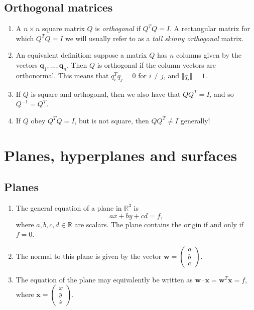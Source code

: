 \documentclass[11pt]{article}
\renewcommand*{\vec}[1]{\mathbf{#1}}
\begin{document}
\subsection{Orthogonal matrices}
\begin{enumerate}
\item A $n\times n$ square matrix $Q$ is \emph{orthogonal} if $\boxed{Q^TQ=I}$. A rectangular matrix for which $Q^TQ=I$ we will usually refer to as a \emph{tall skinny orthogonal} matrix. 
\item An equivalent definition: suppose a matrix $Q$ has $n$ columns given by the vectors $\vec{q}_1, ..., \vec{q}_n$. Then $Q$ is orthogonal if the column vectors are orthonormal. This means that $q_i^Tq_j = 0$ for $i\neq j$, and $\Vert q_i \Vert = 1$. 
\item If $Q$ is square and orthogonal, then we also have that $QQ^T = I$, and so $Q^{-1}=Q^T$.
\item If $Q$ obey $Q^TQ=I$, but is not square, then $QQ^T \neq I$ generally! 
\end{enumerate}

\newpage

\section{Planes, hyperplanes and surfaces}
\subsection{Planes}
\begin{enumerate}
\item The general equation of a plane in $\mathbb{R}^3$ is 
$$\boxed{ax+by+cd = f,}$$
where $a,b,c,d\in\mathbb{R}$ are scalars. The plane contains the origin if and only if $f=0$.
\item The normal to this plane is given by the vector $\vec{w} = \begin{pmatrix} a \\ b \\ c\end{pmatrix}$.
\item The equation of the plane may equivalently be written as $\vec{w}\cdot\vec{x} = \vec{w}^T\vec{x} = f$, where $\vec{x} = \begin{pmatrix} x \\ y \\ z \end{pmatrix}$.
\end{enumerate}
\end{document}
